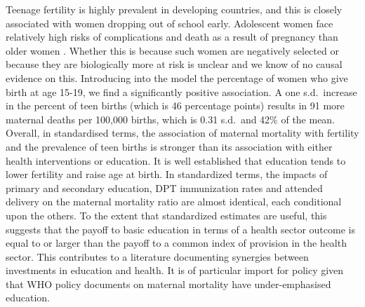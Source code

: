 \documentclass{article}[12pt,subeqn]
\begin{document}
\begin{spacing}{1.4}
Teenage fertility is highly prevalent in developing countries, and this is 
closely associated with women dropping out of school early. Adolescent women face 
relatively high risks of complications and death as a result of pregnancy than 
older women \citep{Condeetal2005, Pattonetal2009}.  Whether this is because such 
women are negatively selected or because they are biologically more at risk is 
unclear and we know of no causal evidence on this. Introducing into the model the 
percentage of women who give birth at age 15-19, we find a significantly positive 
association. A one s.d.\ increase in the percent of teen births (which is 46 
percentage points) results in 91 more maternal deaths per 100,000 births, which is 
0.31 s.d.\ and 42\% of the mean. Overall, in standardised terms, the association 
of maternal mortality with fertility and the prevalence of teen births is stronger 
than its association with either health interventions or education. It is well 
established that education tends to lower fertility and raise age at birth.  In 
standardized terms, the impacts of primary and secondary education, DPT 
immunization rates and attended delivery on the maternal mortality ratio are almost
identical, each conditional upon the others. To the extent that standardized 
estimates are useful, this suggests that the payoff to basic education in terms of 
a health sector outcome is equal to or larger than the payoff to a common index of 
provision in the health sector. This contributes to a literature documenting 
synergies between investments in education and health.  It is of particular import 
for policy given that WHO policy documents on maternal mortality have 
under-emphasised education.


\end{spacing}
\end{document}
